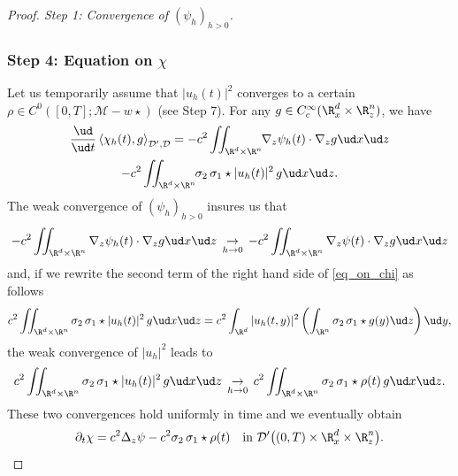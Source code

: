 \begin{proof}[Proof. Step 1: Convergence of $(\psi_{h})_{h>0}$]
\subsubsection*{Step 4: Equation on $\chi$} Let us temporarily assume that
$|u_{h}(t)|^{2}$ converges to a certain $\rho\in C^{0}([0,T];\mathcal{M}-w\star)$ (see Step 7).
For any $g\in C_{c}^{\infty}(\R_{x}^{d}\times\R_{z}^{n})$, we have
\begin{multline}\label{eq_on_chi}
\frac{\ud}{\ud t}\left\langle\chi_{h}(t),g\right\rangle_{\mathcal{D}',\mathcal{D}}=-c^{2}\iint_{\R^{d}\times\R^{n}}\hspace*{-1mm}\nabla_{z}\psi_{h}(t)\cdot\nabla_{z}g\ud x\ud z\\
-c^{2}\iint_{\R^{d}\times\R^{n}}\hspace*{-1mm}\sigma_{2}\,\sigma_{1}\star|u_{h}(t)|^{2}\,g\ud x\ud z.
\end{multline}
The weak convergence of $(\psi_{h})_{h>0}$ insures us that
\[
-c^{2}\iint_{\R^{d}\times\R^{n}}\nabla_{z}\psi_{h}(t)\cdot\nabla_{z}g\ud x\ud z\,\underset{h\to 0}{\to}\,-c^{2}\iint_{\R^{d}\times\R^{n}}\nabla_{z}\psi(t)\cdot\nabla_{z}g\ud x\ud z
\]
and, if we rewrite the second term of the right hand side of \eqref{eq_on_chi} as follows
\[
c^{2}\iint_{\R^{d}\times\R^{n}}\sigma_{2}\,\sigma_{1}\star|u_{h}(t)|^{2}\,g\ud x\ud z=c^{2}\int_{\R^{d}}|u_{h}(t,y)|^{2}\left(\int_{\R^{n}}\sigma_{2}\,\sigma_{1}\star g(y)\ud z\right)\ud y,
\]
the weak convergence of $|u_{h}|^{2}$ leads to
\[
c^{2}\iint_{\R^{d}\times\R^{n}}\sigma_{2}\,\sigma_{1}\star|u_{h}(t)|^{2}\,g\ud x\ud z\,\underset{h\to 0}{\to}\,c^{2}\iint_{\R^{d}\times\R^{n}}\sigma_{2}\,\sigma_{1}\star\rho(t)\,g\ud x\ud z.
\]
These two convergences hold uniformly in time and we eventually obtain
\[
\partial_{t}\chi=c^{2}\Delta_{z}\psi-c^{2}\sigma_{2}\,\sigma_{1}\star\rho(t)\quad\text{in }\mathcal{D}'\bigl((0,T)\times\R_{x}^{d}\times\R_{z}^{n}\bigr).
\]


\end{proof}
